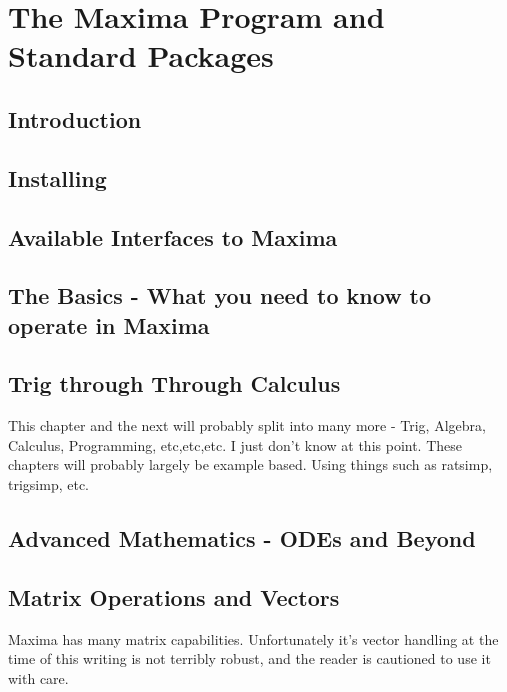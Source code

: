 \documentclass[oneside,english]{book}
\begin{document}
\part{The Maxima Program and Standard Packages}

\chapter{Introduction}
  

\chapter{Installing}
  

\chapter{Available Interfaces to Maxima}
  

\chapter{The Basics - What you need to know to operate in Maxima}
  

\chapter{Trig through Through Calculus}

    This chapter and the next will probably split into many more - Trig,
    Algebra, Calculus, Programming, etc,etc,etc. I just don't know at
    this point. These chapters will probably largely be example based.
    Using things such as ratsimp, trigsimp, etc.
   
   
 
\chapter{Advanced Mathematics - ODEs and Beyond}

   

\chapter{Matrix Operations and Vectors}

    Maxima has many matrix capabilities. Unfortunately it's vector handling
    at the time of this writing is not terribly robust, and the reader
    is cautioned to use it with care.
\end{document}
